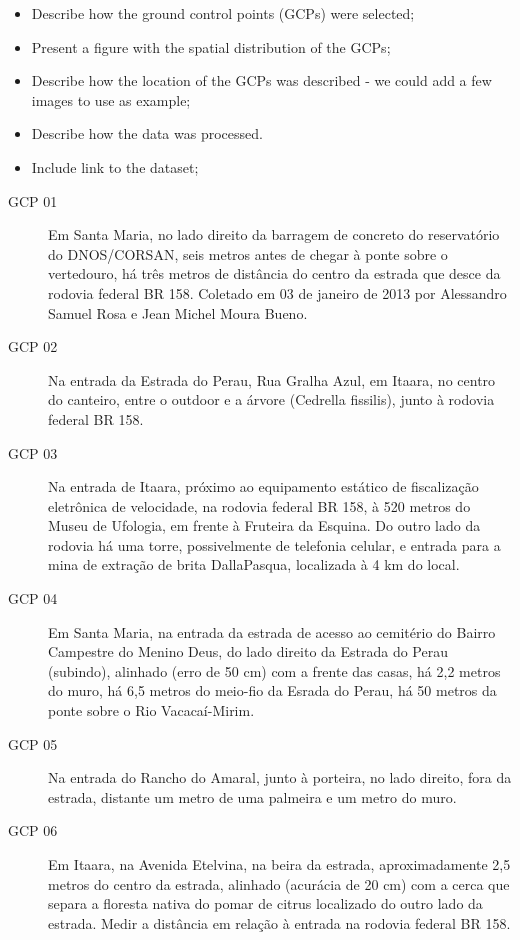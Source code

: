 \begin{itemize}
\item Describe how the ground control points (GCPs) were selected;
\item Present a figure with the spatial distribution of the GCPs;
\item Describe how the location of the GCPs was described - we could 
      add a few images to use as example;
\item Describe how the data was processed.
\item Include link to the dataset;
\end{itemize}

\begin{description}
\item [GCP 01] Em Santa Maria, no lado direito da barragem de concreto do reservatório do 
DNOS/CORSAN, seis metros antes de chegar à ponte sobre o vertedouro, há três metros de distância do 
centro da estrada que desce da rodovia federal BR 158. Coletado em 03 de janeiro de 2013 por 
Alessandro Samuel Rosa e Jean Michel Moura Bueno.

\item [GCP 02] Na entrada da Estrada do Perau, Rua Gralha Azul, em Itaara, no centro do canteiro, 
entre o outdoor e a árvore (Cedrella fissilis), junto à rodovia federal BR 158.

\item [GCP 03] Na entrada de Itaara, próximo ao equipamento estático de fiscalização eletrônica de 
velocidade, na rodovia federal BR 158, à 520 metros do Museu de Ufologia, em frente à Fruteira da 
Esquina. Do outro lado da rodovia há uma torre, possivelmente de telefonia celular, e entrada para a 
mina de extração de brita DallaPasqua, localizada à 4 km do local.

\item [GCP 04] Em Santa Maria, na entrada da estrada de acesso ao cemitério do Bairro Campestre do 
Menino Deus, do lado direito da Estrada do Perau (subindo), alinhado (erro de 50 cm) com a frente 
das casas, há 2,2 metros do muro, há 6,5 metros do meio-fio da Esrada do Perau, há 50 metros da 
ponte sobre o Rio Vacacaí-Mirim.

\item [GCP 05] Na entrada do Rancho do Amaral, junto à porteira, no lado direito, fora da estrada, 
distante um metro de uma palmeira e um metro do muro.

\item [GCP 06] Em Itaara, na Avenida Etelvina, na beira da estrada, aproximadamente 2,5 metros do 
centro da estrada, alinhado (acurácia de 20 cm) com a cerca que separa a floresta nativa do pomar de 
citrus localizado do outro lado da estrada. Medir a distância em relação à entrada na rodovia 
federal BR 158.


\end{description}

